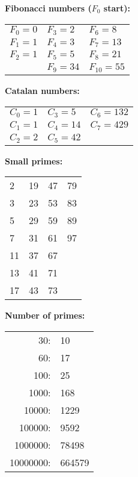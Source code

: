 \vspace{2mm}
\textbf{Fibonacci numbers ($F_0$ start):} \\[1mm]
\begin{tabular}{lll}
$F_0=0$ & $F_3=2$ & $F_6=8$ \\
$F_1=1$ & $F_4=3$ & $F_7=13$ \\
$F_2=1$ & $F_5=5$ & $F_8=21$ \\
& $F_9=34$ & $F_{10}=55$ \\
\end{tabular}

\vspace{2mm}
\textbf{Catalan numbers:} \\[1mm]
\begin{tabular}{lll}
$C_0=1$ & $C_3=5$ & $C_6=132$ \\
$C_1=1$ & $C_4=14$ & $C_7=429$ \\
$C_2=2$ & $C_5=42$ &  \\
\end{tabular}

\vspace{2mm}
\textbf{Small primes:} \\[1mm]
\begin{tabular}{llll}
2 & 19 & 47 & 79 \\
3 & 23 & 53 & 83 \\
5 & 29 & 59 & 89 \\
7 & 31 & 61 & 97 \\
11 & 37 & 67 &  \\
13 & 41 & 71 &  \\
17 & 43 & 73 &  \\
\end{tabular}

\vspace{2mm}
\textbf{Number of primes:} \\[1mm]
\begin{tabular}{rl}
30: & 10 \\
60: & 17 \\
100: & 25 \\
1000: & 168 \\
10000: & 1229 \\
100000: & 9592 \\
1000000: & 78498 \\
10000000: & 664579 \\
\end{tabular}

